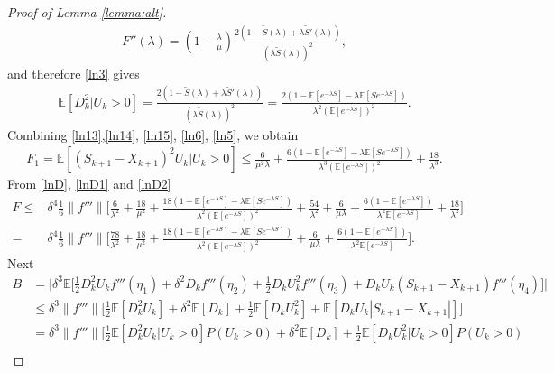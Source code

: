 \documentclass[11pt,letterpaper,reqno]{article}
\theoremstyle{thmstyleone}%
\theoremstyle{thmstyletwo}%
\theoremstyle{thmstylethree}%
\numberwithin{equation}{section}
\begin{document}
\begin{proof}[Proof of Lemma \ref{lemma:alt}]
\begin{align*}
    F''(\lambda) = \left(1-\frac{\lambda}{\mu} \right)\frac{2(1 - \tilde{S}(\lambda) + \lambda \tilde{S}'(\lambda))}{(\lambda \tilde{S}(\lambda))^2},
\end{align*}
and therefore \eqref{ln3} gives
\begin{align}\label{ln5}
\mathbb E[D_{k}^2|U_k>0] =  \frac{2(1 - \tilde{S}(\lambda) + \lambda \tilde{S}'(\lambda))}{(\lambda \tilde{S}(\lambda))^2}=\frac{2\left(1 - \mathbb E[e^{-\lambda S}] - \lambda \mathbb E[S e^{-\lambda S}]\right)}{\lambda^2 (\mathbb E[e^{-\lambda S}])^2}.
\end{align}
Combining \eqref{ln13},\eqref{ln14}, \eqref{ln15}, \eqref{ln6}, \eqref{ln5}, we obtain 
\begin{align}\label{lnD1}
F_1=\mathbb E[(S_{k+1}-X_{k+1})^2U_k|U_k>0] \leq \frac{6}{\mu^2\lambda} + \frac{6\left(1 - \mathbb E[e^{-\lambda S}] - \lambda \mathbb E[S e^{-\lambda S}]\right)}{\lambda^3 (\mathbb E[e^{-\lambda S}])^2} + \frac{18}{\lambda^3}.
\end{align}
From \eqref{lnD}, \eqref{lnD1} and \eqref{lnD2}
\begin{align}\label{lnDbound}
    F \leq& \delta^4 \frac{1}{6}\| f'''\|\bigg[\frac{6}{\lambda^2}+\frac{18}{\mu^2} + \frac{18\left(1 - \mathbb E[e^{-\lambda S}] - \lambda \mathbb E[S e^{-\lambda S}]\right)}{\lambda^2 (\mathbb E[e^{-\lambda S}])^2} + \frac{54}{\lambda^2}+ \frac{6}{\mu \lambda}+\frac{6(1-\mathbb E[e^{-\lambda S}])}{\lambda^2\mathbb E[e^{-\lambda S}]}+\frac{18}{\lambda^2}\bigg] \nonumber\\
    =& \delta^4 \frac{1}{6}\| f'''\|\bigg[\frac{78}{\lambda^2}+\frac{18}{\mu^2} + \frac{18\left(1 - \mathbb E[e^{-\lambda S}] - \lambda \mathbb E[S e^{-\lambda S}]\right)}{\lambda^2 (\mathbb E[e^{-\lambda S}])^2} + \frac{6}{\mu \lambda}+\frac{6(1-\mathbb E[e^{-\lambda S}])}{\lambda^2\mathbb E[e^{-\lambda S}]}\bigg].
\end{align}
Next
 \begin{align}\label{lnB}
B &= \bigg| \delta^3 \mathbb E \bigg[\frac{1}{2}D_k^2U_kf'''(\eta_1)+\delta^2 D_k f'''(\eta_2) +\frac{1}{2}D_kU_k^2f'''(\eta_3)+D_kU_k(S_{k+1}-X_{k+1})f'''(\eta_4)\bigg] \bigg| \nonumber\\
       & \leq \delta^3 \|f'''\|\bigg[\frac{1}{2}\mathbb E[D_k^2U_k]+\delta^2\mathbb E[D_k]+ \frac{1}{2}\mathbb E[D_kU_k^2] +\mathbb E[D_kU_k|S_{k+1}-X_{k+1}|] \bigg] \nonumber\\
       & = \delta^3 \|f'''\|\bigg[\frac{1}{2}\mathbb E[D_k^2U_k|U_k>0]P(U_k>0)+\delta^2\mathbb E[D_k]+ \frac{1}{2}\mathbb E[D_kU_k^2|U_k>0]P(U_k>0) \nonumber\\

\end{align}
\end{proof}
\end{document}
